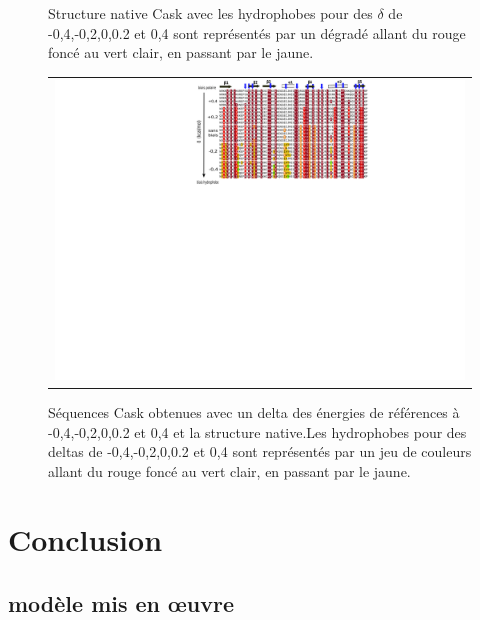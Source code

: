 \begin{figure}[!h]
  \centering
  \caption{\small Structure native Cask avec les hydrophobes pour des $\delta$ de -0,4,-0,2,0,0.2 et 0,4 sont représentés par un dégradé allant du rouge foncé au vert clair, en passant par le jaune.}

  \begin{tabular}{c}
    \includegraphics[width=25cm]{titration/alignCASK.png} \\
  \end{tabular}
  
  \caption{\small Séquences Cask obtenues avec un delta des énergies de références à -0,4,-0,2,0,0.2 et 0,4 et la structure native.Les hydrophobes pour des deltas de -0,4,-0,2,0,0.2 et 0,4 sont représentés par un jeu de couleurs allant du rouge foncé au vert clair, en passant par le jaune.}
  \label{titrationAlignCask}
\end{figure}


\section{Conclusion}

\subsection{modèle mis en œuvre}


